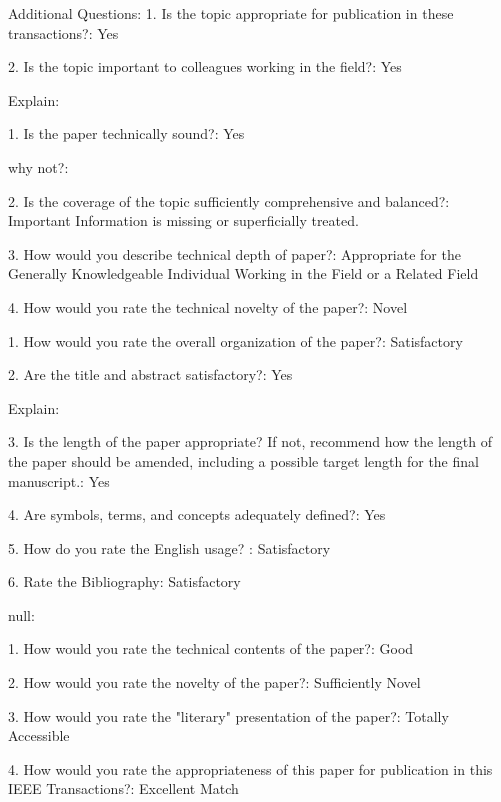 \documentclass{article}
\begin{document}
Additional Questions:
1. Is the topic appropriate for publication in these transactions?: Yes

2. Is the topic important to colleagues working in the field?: Yes

Explain:

1. Is the paper technically sound?: Yes

why not?:

2. Is the coverage of the topic sufficiently comprehensive and balanced?: Important Information is missing or superficially treated.

3. How would you describe technical depth of paper?: Appropriate for the Generally Knowledgeable Individual Working in the Field or a Related Field

4. How would you rate the technical novelty of the paper?: Novel

1. How would you rate the overall organization of the paper?: Satisfactory

2. Are the title and abstract satisfactory?: Yes

Explain:

3. Is the length of the paper appropriate? If not, recommend how the length of the paper should be amended, including a possible target length for the final manuscript.: Yes

4. Are symbols, terms, and concepts adequately defined?: Yes

5. How do you rate the English usage? : Satisfactory

6. Rate the Bibliography: Satisfactory

null:

1. How would you rate the technical contents of the paper?: Good

2. How would you rate the novelty of the paper?: Sufficiently Novel

3. How would you rate the "literary" presentation of the paper?: Totally Accessible

4. How would you rate the appropriateness of this paper for publication in this IEEE Transactions?: Excellent Match
\end{document}
